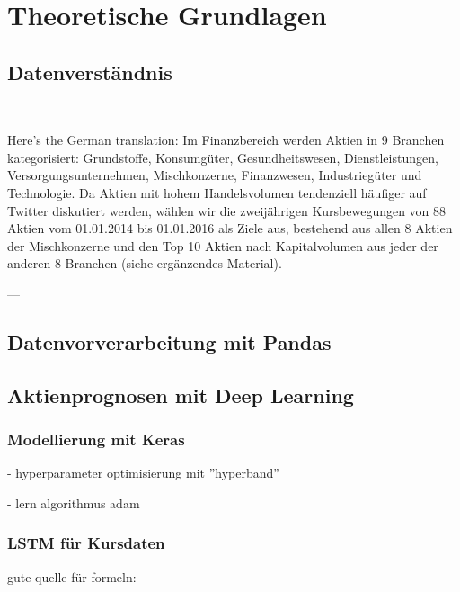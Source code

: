 \newpage
\section{Theoretische Grundlagen}\label{sec:theorie}



\subsection{Datenverständnis}\label{sec:theorie_data_understanding}

---

Here's the German translation:
Im Finanzbereich werden Aktien in 9 Branchen kategorisiert: Grundstoffe, Konsumgüter, Gesundheitswesen, Dienstleistungen, Versorgungsunternehmen, Mischkonzerne, Finanzwesen, Industriegüter und Technologie. Da Aktien mit hohem Handelsvolumen tendenziell häufiger auf Twitter diskutiert werden, wählen wir die zweijährigen Kursbewegungen von 88 Aktien vom 01.01.2014 bis 01.01.2016 als Ziele aus, bestehend aus allen 8 Aktien der Mischkonzerne und den Top 10 Aktien nach Kapitalvolumen aus jeder der anderen 8 Branchen (siehe ergänzendes Material).

---
\autocite[Kap. 3]{xu2018StockMovement}

\subsection{Datenvorverarbeitung mit Pandas}\label{sec:theorie_pandas}


\subsection{Aktienprognosen mit Deep Learning}\label{sec:theorie_dl}

\subsubsection{Modellierung mit Keras}\label{sec:theorie_keras}
- hyperparameter optimisierung mit ''hyperband''
\autocite{li2018hyperband}

- lern algorithmus adam 
\autocite{website:keras-adam}
\autocite{kingma2015adam}

\subsubsection{LSTM für Kursdaten}\label{sec:theorie_lstm}

gute quelle für formeln: \autocite{guan2020stockprice}

